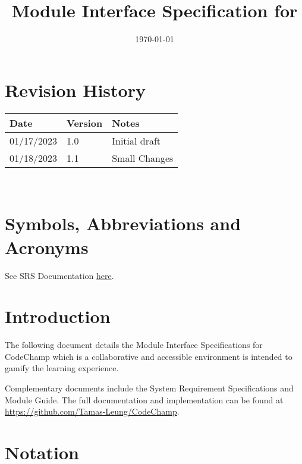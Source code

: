 \documentclass[12pt, titlepage]{article}
\begin{document}
\title{Module Interface Specification for \progname{}}

\author{\authname}

\date{\today}

\maketitle


\section{Revision History}

\begin{tabularx}{\textwidth}{p{3cm}p{2cm}X}
\toprule {\bf Date} & {\bf Version} & {\bf Notes}\\
\midrule
01/17/2023 & 1.0 & Initial draft\\
01/18/2023 & 1.1 & Small Changes\\
\bottomrule
\end{tabularx}

~\newpage

\section{Symbols, Abbreviations and Acronyms}

See SRS Documentation \href{https://github.com/Tamas-Leung/CodeChamp/tree/main/docs/SRS}{here}.

\newpage

\tableofcontents

\newpage


\section{Introduction}

The following document details the Module Interface Specifications for CodeChamp which is a collaborative and accessible environment is intended to gamify the learning experience.

Complementary documents include the System Requirement Specifications
and Module Guide.  The full documentation and implementation can be
found at \url{https://github.com/Tamas-Leung/CodeChamp}. 

\section{Notation}
\end{document}
